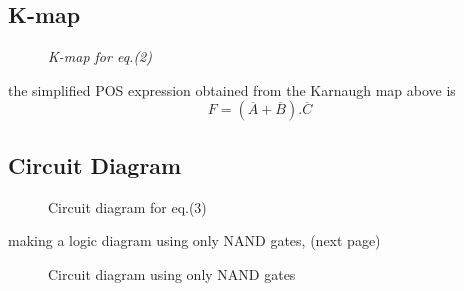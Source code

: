 \documentclass{article}
\begin{document}
\subsection{K-map}

\begin{figure}[h]
    \centering
    
    \caption{\textit{K-map for eq.(2)}}
    \label{fig:kmap}
\end{figure}

the simplified POS expression obtained from the Karnaugh map above is
\begin{equation}
    F=(\overline{A}+\overline{B}).\overline{C}
\end{equation}

\subsection{Circuit Diagram}
\begin{figure}[h]
    \centering
    
    \caption{Circuit diagram for eq.(3)}
    \label{fig:circuit1}
\end{figure}
making a logic diagram using only NAND gates, (next page)
\begin{figure}[h]
    \centering
    
    \caption{Circuit diagram using only NAND gates}
    \label{fig:circuit2}
\end{figure}
\end{document}
